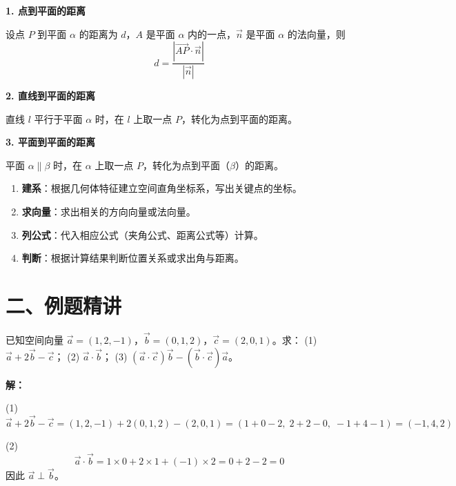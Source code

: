 \documentclass[12pt, a4paper]{ctexart}
\begin{document}
\begin{knowledgebox}[空间距离的向量求法]

\textbf{1. 点到平面的距离}

设点 $P$ 到平面 $\alpha$ 的距离为 $d$，$A$ 是平面 $\alpha$ 内的一点，$\vec{n}$ 是平面 $\alpha$ 的法向量，则
\[
d=\frac{|\overrightarrow{AP}\cdot\vec{n}|}{|\vec{n}|}
\]

\textbf{2. 直线到平面的距离}

直线 $l$ 平行于平面 $\alpha$ 时，在 $l$ 上取一点 $P$，转化为点到平面的距离。

\textbf{3. 平面到平面的距离}

平面 $\alpha\parallel\beta$ 时，在 $\alpha$ 上取一点 $P$，转化为点到平面（$\beta$）的距离。
\end{knowledgebox}

\begin{tipbox}[向量法解题的一般步骤]
\begin{enumerate}[nosep]
  \item \textbf{建系}：根据几何体特征建立空间直角坐标系，写出关键点的坐标。
  \item \textbf{求向量}：求出相关的方向向量或法向量。
  \item \textbf{列公式}：代入相应公式（夹角公式、距离公式等）计算。
  \item \textbf{判断}：根据计算结果判断位置关系或求出角与距离。
\end{enumerate}
\end{tipbox}

\section*{\textcolor{examorange}{二、例题精讲}}

\begin{examplebox}[【例题1】空间向量的基本运算]
已知空间向量 $\vec{a}=(1,2,-1)$，$\vec{b}=(0,1,2)$，$\vec{c}=(2,0,1)$。求：
(1) $\vec{a}+2\vec{b}-\vec{c}$；
(2) $\vec{a}\cdot\vec{b}$；
(3) $(\vec{a}\cdot\vec{c})\vec{b}-(\vec{b}\cdot\vec{c})\vec{a}$。
\end{examplebox}

\textbf{解：}

(1)
\[
\vec{a}+2\vec{b}-\vec{c}=(1,2,-1)+2(0,1,2)-(2,0,1)=(1+0-2,\;2+2-0,\;-1+4-1)=(-1,4,2)
\]

(2)
\[
\vec{a}\cdot\vec{b}=1\times0+2\times1+(-1)\times2=0+2-2=0
\]
因此 $\vec{a}\perp\vec{b}$。
\end{document}
